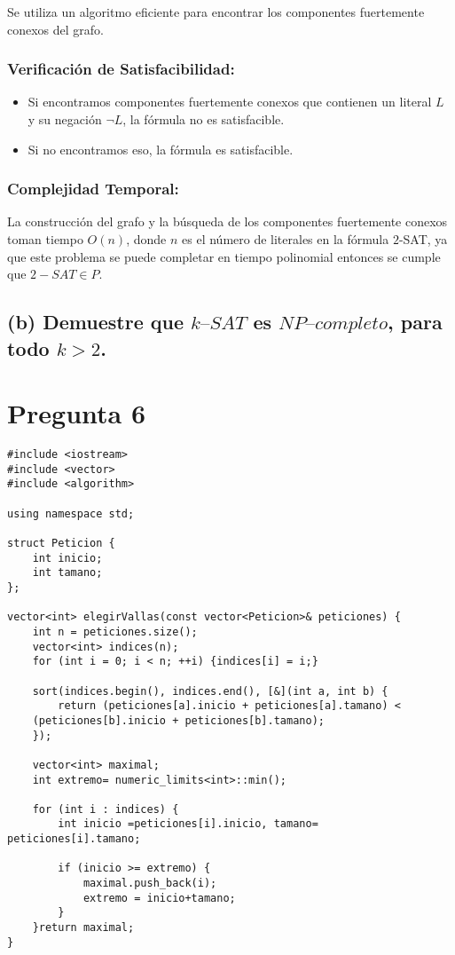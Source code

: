 \documentclass{article}
\begin{document}
Se utiliza un algoritmo eficiente para encontrar los componentes fuertemente conexos del grafo.

\subsubsection*{Verificación de Satisfacibilidad:}
\begin{itemize}
    \item Si encontramos componentes fuertemente conexos que contienen un literal $L$ y su negación $\neg L$, la fórmula no es satisfacible.
    \item Si no encontramos eso, la fórmula es satisfacible.
\end{itemize}

\subsubsection*{Complejidad Temporal:}
La construcción del grafo y la búsqueda de los componentes fuertemente conexos toman tiempo $O(n)$, donde $n$ es el número de literales en la fórmula $2$-SAT, ya que este problema se puede completar en tiempo polinomial entonces se cumple que $2-SAT \in P$.

\subsection*{(b) Demuestre que $k–SAT$ es $NP–completo$, para todo $k > 2$.}

\section*{Pregunta 6}

\begin{lstlisting}[style=customcpp]
#include <iostream>
#include <vector>
#include <algorithm>

using namespace std;

struct Peticion {
    int inicio;
    int tamano;
};

vector<int> elegirVallas(const vector<Peticion>& peticiones) {
    int n = peticiones.size();
    vector<int> indices(n);
    for (int i = 0; i < n; ++i) {indices[i] = i;}

    sort(indices.begin(), indices.end(), [&](int a, int b) {
        return (peticiones[a].inicio + peticiones[a].tamano) < 
	(peticiones[b].inicio + peticiones[b].tamano);
    });

    vector<int> maximal;
    int extremo= numeric_limits<int>::min();

    for (int i : indices) {
        int inicio =peticiones[i].inicio, tamano= peticiones[i].tamano;

        if (inicio >= extremo) {
            maximal.push_back(i);
            extremo = inicio+tamano;
        }
    }return maximal;
}
\end{lstlisting}
\end{document}
